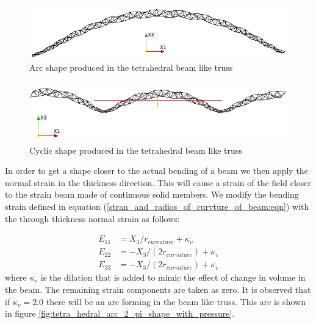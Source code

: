 \begin{figure} 
\centering
\includegraphics[width=6.0in]{./chap_5_active_trusses/images_linear_tetrahedral/tetra_hedral_arc_pi_shape.png}
\caption{Arc shape produced in the tetrahedral beam like truss}
\label{fig:tetra_hedral_arc_pi_shape}
\end{figure}  


\begin{figure} 
\centering
\includegraphics[width=6.0in]{./chap_5_active_trusses/images_linear_tetrahedral/tetra_hedral_arc_2_pi_shape.png}
\caption{Cyclic shape produced in the tetrahedral beam like truss}
\label{fig:tetra_hedral_arc_2_pi_shape}
\end{figure} 


In order to get a shape closer to the actual bending of a beam we then apply the normal strain in the thickness direction. This will cause a strain of the field closer to the strain beam made of continuous solid members. We modify the bending strain defined in equation (\ref{stran_and_radios_of_curvture_of_beam:eqn}) with the through thickness normal strain as follows: 

\begin{equation}
\begin{aligned}
E_{11}&=X_3/r_{curvature}+\kappa_v \\
E_{22}&=-X_3/(2r_{curvature})+\kappa_v \\
E_{33}&=-X_3/(2r_{curvature})+\kappa_v
\end{aligned}
\label{strain_with_dilation:eqn}
\end{equation}
where $\kappa_v$  is the dilation that is added to mimic the effect of change in volume in the beam. The remaining strain components are taken as zero. It is observed that if $\kappa_v=2.0$ there will be an arc forming in the beam like truss. This arc is shown in figure  \ref{fig:tetra_hedral_arc_2_pi_shape_with_pressure}. 

